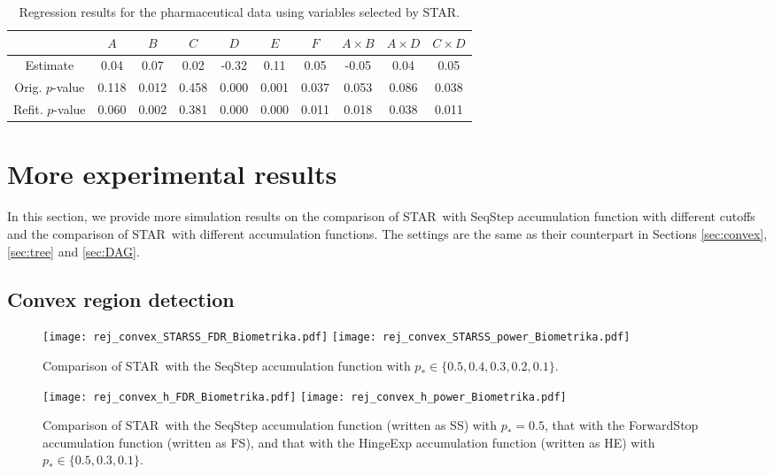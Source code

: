 \documentclass{biometrika}
\renewcommand{\star}{STAR}
\newcommand{\pth}{p_{*}}
\newcommand{\1}{\mathbf{1}}
\begin{document}
\begin{table}[h]
  \centering
  \begin{tabular}{c|ccccccccc}
    \toprule
    & $A$ & $B$ & $C$ & $D$ & $E$ & $F$ & $A\times B$ & $A\times D$ & $C\times D$\\
    \midrule
  Estimate  & 0.04 & 0.07 & 0.02 & -0.32 & 0.11 & 0.05 & -0.05 & 0.04 & 0.05\\
  Orig. $p$-value  & 0.118 & 0.012 & 0.458 & 0.000 & 0.001 & 0.037 & 0.053 & 0.086 & 0.038\\
  Refit. $p$-value  & 0.060 & 0.002 & 0.381 & 0.000 & 0.000 & 0.011 & 0.018 & 0.038 & 0.011\\
    \bottomrule
  \end{tabular}
  \caption{Regression results for the pharmaceutical data using variables selected by \star.}\label{tab:DAG_pvals}
\end{table}

\section{More experimental results}\label{sec:more}
In this section, we provide more simulation results on the comparison of \star ~with SeqStep accumulation function with different cutoffs and the comparison of \star ~with different accumulation functions. The settings are the same as their counterpart in Sections \ref{sec:convex}, \ref{sec:tree} and \ref{sec:DAG}.

\subsection{Convex region detection}\label{app:experiment_convex}
\begin{figure}[h]
  \centering
  \texttt{[image: rej\_convex\_STARSS\_FDR\_Biometrika.pdf]}
  \texttt{[image: rej\_convex\_STARSS\_power\_Biometrika.pdf]}
  \caption{Comparison of \star ~with the SeqStep accumulation function with $\pth\in \{0.5, 0.4, 0.3, 0.2, 0.1\}$. }\label{fig:rej_convex_STARSS}
\end{figure}

\begin{figure}[h]
  \centering
  \texttt{[image: rej\_convex\_h\_FDR\_Biometrika.pdf]}
  \texttt{[image: rej\_convex\_h\_power\_Biometrika.pdf]}
  \caption{Comparison of \star ~with the SeqStep accumulation function (written as SS) with $\pth = 0.5$, that with the ForwardStop accumulation function (written as FS), and that with the HingeExp accumulation function (written as HE) with $\pth\in \{0.5, 0.3, 0.1\}$.}\label{fig:rej_convex_h}
\end{figure}
\end{document}
